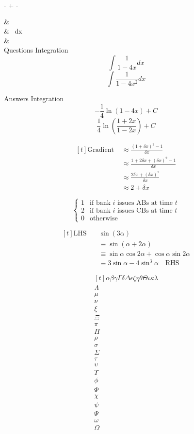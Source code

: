 
 -  + - 


& \\ 


& \ dx\\ 

&\\ 


Questions Integration
\[\int {\frac{1}{{1 - 4x}}dx} \]
\[\int {\frac{1}{{1 - 4{x^2}}}dx}\]

Answers Integration 
\[- \frac{1}{4}\ln \left( {1 - 4x} \right) + C\]
\[\frac{1}{4}\ln \left( {\frac{{1 + 2x}}{{1 - 2x}}} \right) + C\]



\[\begin{aligned}[t] 
\text{Gradient } &\approx \frac{(1+\delta{x})^2-1}{\delta{x}}\\ 
& \approx \frac{1+2\delta{x}+(\delta{x})^2 -1}{\delta{x}}\\ 
& \approx \frac{2\delta{x}+(\delta{x})^2}{\delta{x}}\\ 
&\approx 2+\delta{x} 
\end{aligned}\]




\[\begin{cases}
      1 & \text{if bank $i$ issues ABs at time $t$}\\
      2 & \text{if bank $i$ issues CBs at time $t$}\\
      0 & \text{otherwise}
    \end{cases}\]
	

\[\begin{aligned}[t]
\text{LHS } \ \ \ & \sin{(3\alpha)}\\
& \equiv \sin{(\alpha + 2\alpha)}\\
& \equiv \sin{\alpha}\cos{2\alpha}+\cos{\alpha}\sin{2\alpha}\\
& \equiv 3\sin{\alpha}-4\sin^3{\alpha} \ \ \ \text{ RHS}
\end{aligned}\]


\[\begin{aligned}[t]
\alpha
\beta
\gamma
\Gamma
\delta
\Delta
\epsilon
\zeta
\eta
\theta
\Theta
\iota
\kappa
\lambda\\
\Lambda\\
\mu\\
\nu\\
\xi\\
\Xi\\
\pi\\
\Pi\\
\rho\\
\sigma\\
\Sigma\\
\tau\\
\upsilon\\
\Upsilon\\
\phi\\
\Phi\\
\chi\\
\psi\\
\Psi\\
\omega\\
\Omega\\

\end{aligned}\]


